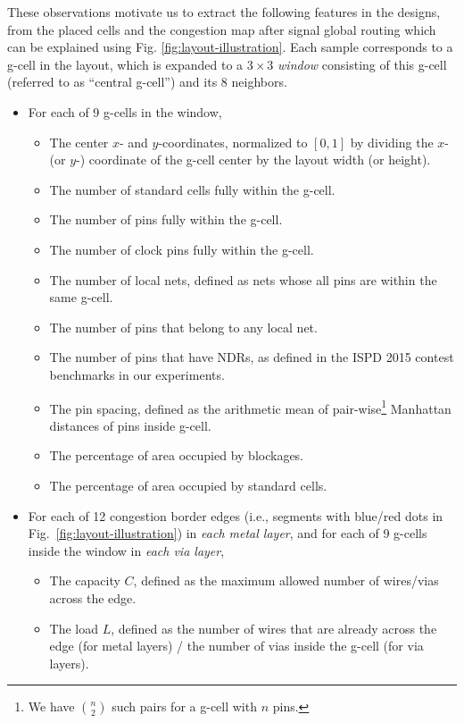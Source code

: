 \documentclass[10pt, final, letter, twocolumns]{IEEEtran}
\begin{document}
These observations motivate us to extract the following features
in the designs, from the placed cells and the congestion
map after signal global routing which can be explained using Fig. \ref{fig:layout-illustration}. Each sample corresponds to a g-cell in the layout, which is expanded to a $3\times3$ \textit{window} consisting of this g-cell (referred to as ``central g-cell'') and its 8 neighbors.
\begin{itemize}
\item For each of 9 g-cells in the window,

\begin{itemize}
\item The center $x$- and $y$-coordinates, normalized to $[0,1]$ by dividing the $x$- (or $y$-) coordinate of the g-cell center by the layout width (or height).
\item The number of standard cells fully within the g-cell.
\item The number of pins fully within the g-cell.
\item The number of clock pins fully within the g-cell.
\item The number of local nets, defined as nets whose all pins are within the same g-cell.
\item The number of pins that belong to any local net.
\item The number of pins that have NDRs, as defined in the ISPD 2015 contest benchmarks in our experiments.
\item The pin spacing, defined as the arithmetic mean of pair-wise\footnote{We have $n\choose 2$ such pairs for a g-cell with $n$ pins.} Manhattan distances of pins inside g-cell.
\item The percentage of area occupied by blockages.
\item The percentage of area occupied by standard cells.
\end{itemize}
\item For each of 12 congestion border edges (i.e., segments with blue/red dots  in Fig.~\ref{fig:layout-illustration}) in \emph{each metal layer}, and for each of 9 g-cells inside the window in \emph{each via layer},
\begin{itemize}
\item The capacity $C$, defined as the maximum allowed number of wires/vias across the edge. 
\item The load $L$, defined as the number of wires that are already across the edge (for metal layers) / the number of vias inside the g-cell (for via layers).

\end{itemize}
\end{itemize}
\end{document}
